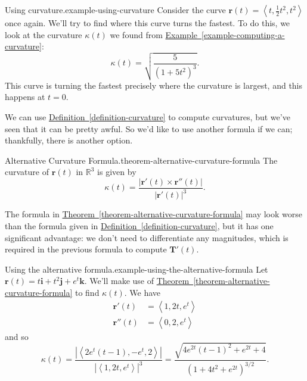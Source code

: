 \documentclass[10pt,]{book}
\numberwithin{equation}{section}
\newcommand{\RR}{\mathbb{R}}
\newcommand{\vv}[1]{\mathbf{#1}}
\newcommand{\dotprod}[1]{\left\langle #1 \right\rangle}
\begin{document}
\begin{example}{Using curvature.}{example-using-curvature}%
\hypertarget{p-1291}{}%
Consider the curve \(\vv{r}(t) = \dotprod{t,\frac{1}{2}t^{2},t^{2}}\) once again. We'll try to find where this curve turns the fastest. To do this, we look at the curvature \(\kappa(t)\) we found from \hyperref[example-computing-a-curvature]{Example~\ref{example-computing-a-curvature}}:%
%
\begin{equation*}
\kappa(t) = \sqrt{\frac{5}{(1+5t^{2})^{3}}}.
\end{equation*}
\hypertarget{p-1292}{}%
This curve is turning the fastest precisely where the curvature is largest, and this happens at \(t=0\).%
\end{example}
\hypertarget{p-1293}{}%
We can use \hyperref[definition-curvature]{Definition~\ref{definition-curvature}} to compute curvatures, but we've seen that it can be pretty awful. So we'd like to use another formula if we can; thankfully, there is another option.%
\begin{theorem}{Alternative Curvature Formula.}{}{theorem-alternative-curvature-formula}%
\hypertarget{p-1294}{}%
The curvature of \(\vv{r}(t)\) in \(\RR^{3}\) is given by%
%
\begin{equation*}
\kappa(t) = \frac{|\vv{r}'(t)\times\vv{r}''(t)|}{|\vv{r}'(t)|^{3}}.
\end{equation*}
\end{theorem}
\hypertarget{p-1295}{}%
The formula in \hyperref[theorem-alternative-curvature-formula]{Theorem~\ref{theorem-alternative-curvature-formula}} may look worse than the formula given in \hyperref[definition-curvature]{Definition~\ref{definition-curvature}}, but it has one significant advantage: we don't need to differentiate any magnitudes, which is required in the previous formula to compute \(\vv{T}'(t)\).%
\begin{example}{Using the alternative formula.}{example-using-the-alternative-formula}%
\hypertarget{p-1296}{}%
Let \(\vv{r}(t) = t\vv{i}+t^{2}\vv{j}+e^{t}\vv{k}\). We'll make use of \hyperref[theorem-alternative-curvature-formula]{Theorem~\ref{theorem-alternative-curvature-formula}} to find \(\kappa(t).\) We have%
%
\begin{align*}
\vv{r}'(t) & = \dotprod{1,2t,e^{t}} \\
\vv{r}''(t) & = \dotprod{0,2,e^{t}} 
\end{align*}
\hypertarget{p-1297}{}%
and so%
%
\begin{equation*}
\kappa(t) = \frac{|\dotprod{2e^{t}(t-1),-e^{t},2}|}{|\dotprod{1,2t,e^{t}}|^{3}} = \frac{\sqrt{4e^{2t}(t-1)^{2}+e^{2t}+4}}{(1+4t^{2}+e^{2t})^{3/2}}.
\end{equation*}
\end{example}
%
%
\typeout{************************************************}
\typeout{************************************************}
%
\end{document}
